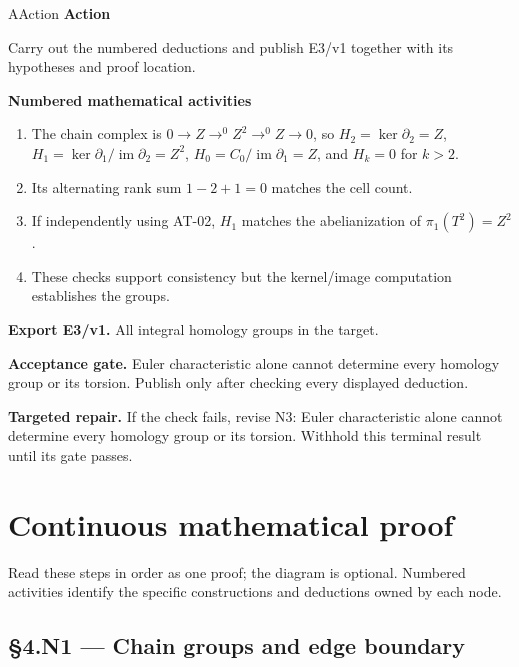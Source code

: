\documentclass[preprint,12pt,aps,pra,showkeys,amsmath,amssymb,superscriptaddress,floatfix]{revtex4-2}
\theoremstyle{definition}
\theoremstyle{remark}
\newcommand{\mmfaculty}[3]{%
 \begin{mmfacultybox}{#1}{#2}
 {\sffamily\bfseries\color{MMBlue}#2}\par\smallskip #3
 \end{mmfacultybox}}
\newcommand{\field}[2]{\par\smallskip\noindent\textbf{#1.} #2\par}
\begin{document}
\mmfaculty{A}{Action}{Carry out the numbered deductions and publish E3/v1 together with its
hypotheses and proof location.}

\smallskip\noindent\textbf{Numbered mathematical activities}

\begin{enumerate}[label=N3.\arabic*,leftmargin=3.4em]

\item The chain complex is \(0\to Z\to ^{0}Z^{2}\to ^{0}Z\to 0\), so
\(H_{2}=\operatorname{ker} \partial _{2}=Z\),
\(H_{1}=\operatorname{ker} \partial _{1}/\operatorname{im} \partial _{2}=Z^{2}\),
\(H_{0}=C_{0}/\operatorname{im} \partial _{1}=Z\), and \(H_k=0\) for
\(k>2\).

\item Its alternating rank sum \(1-2+1=0\) matches the cell count.

\item If independently using AT-02, \(H_{1}\) matches the abelianization of
\(\pi _{1}(T^{2})=Z^{2}\).

\item These checks support consistency but the kernel/image computation
establishes the groups.

\end{enumerate}

\field{Export E3/v1}{All integral homology groups in the target.}

\field{Acceptance gate}{Euler characteristic alone cannot determine every homology group or its
torsion. Publish only after checking every displayed deduction.}

\field{Targeted repair}{If the check fails, revise N3: Euler characteristic alone cannot
determine every homology group or its torsion. Withhold this terminal
result until its gate passes.}

\endgroup\clearpage\section{Continuous mathematical proof}\label{sec:proof}

Read these steps in order as one proof; the diagram is optional.
Numbered activities identify the specific constructions and deductions
owned by each node.

\subsection{§4.N1 --- Chain groups and edge
boundary}\label{n1-chain-groups-and-edge-boundary}
\end{document}
